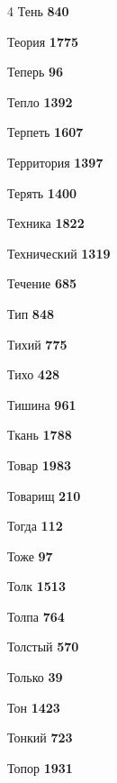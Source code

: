 \begin{multicols}{4}
\noindent Тень \dotfill \textbf{\color{secondary} 840}\par
\noindent Теория \dotfill \textbf{\color{secondary} 1775}\par
\noindent Теперь \dotfill \textbf{\color{secondary} 96}\par
\noindent Тепло \dotfill \textbf{\color{secondary} 1392}\par
\noindent Терпеть \dotfill \textbf{\color{secondary} 1607}\par
\noindent Территория \dotfill \textbf{\color{secondary} 1397}\par
\noindent Терять \dotfill \textbf{\color{secondary} 1400}\par
\noindent Техника \dotfill \textbf{\color{secondary} 1822}\par
\noindent Технический \dotfill \textbf{\color{secondary} 1319}\par
\noindent Течение \dotfill \textbf{\color{secondary} 685}\par
\noindent Тип \dotfill \textbf{\color{secondary} 848}\par
\noindent Тихий \dotfill \textbf{\color{secondary} 775}\par
\noindent Тихо \dotfill \textbf{\color{secondary} 428}\par
\noindent Тишина \dotfill \textbf{\color{secondary} 961}\par
\noindent Ткань \dotfill \textbf{\color{secondary} 1788}\par
\noindent Товар \dotfill \textbf{\color{secondary} 1983}\par
\noindent Товарищ \dotfill \textbf{\color{secondary} 210}\par
\noindent Тогда \dotfill \textbf{\color{secondary} 112}\par
\noindent Тоже \dotfill \textbf{\color{secondary} 97}\par
\noindent Толк \dotfill \textbf{\color{secondary} 1513}\par
\noindent Толпа \dotfill \textbf{\color{secondary} 764}\par
\noindent Толстый \dotfill \textbf{\color{secondary} 570}\par
\noindent Только \dotfill \textbf{\color{secondary} 39}\par
\noindent Тон \dotfill \textbf{\color{secondary} 1423}\par
\noindent Тонкий \dotfill \textbf{\color{secondary} 723}\par
\noindent Топор \dotfill \textbf{\color{secondary} 1931}\par

\end{multicols}
